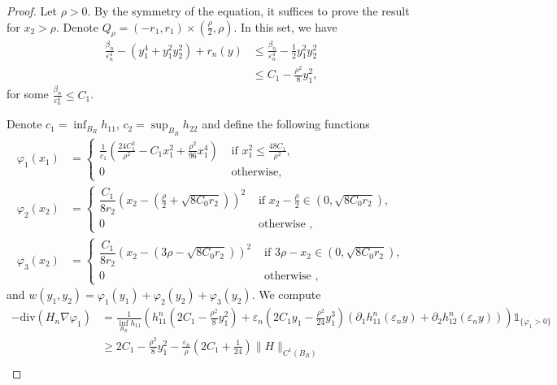 \documentclass[10pt,a4paper]{article}
\newcommand{\divg}{\mathrm{div}}
\numberwithin{equation}{section}
\begin{document}
\begin{proof}
	Let $ \rho > 0 $. By the symmetry of the equation, it suffices to prove the result for $ x_2 > \rho $. Denote $ Q_{\rho} = (-r_1, r_1) \times \left( \frac{\rho}{2}, \rho \right) $. In this set, we have
	\begin{align*}
		\frac{\beta_n}{\varepsilon_n^{4}} - (y_1^4 + y_1^2y_2^2) + r_n(y) & \leq \frac{\beta_n}{\varepsilon_n^{4}} - \frac{1}{2} y_1^2 y_2^2 \\ 
										  &\leq C_1 - \frac{\rho^2}{8} y_1^2 ,
	\end{align*}
for some $ \frac{\beta_n}{\varepsilon_n^4} \leq C_1 $. 

Denote $ c_1 = \inf_{B_R} h_{11} $, $ c_2 = \sup_{B_R}h_{22} $ and define the following functions
\begin{align*}
	\varphi_1(x_1) & = \begin{cases}
		\frac{1}{c_1} \left( \frac{24C_1^2}{\rho^2} - C_1 x_1^2 + \frac{\rho^2}{96} x_1^4 \right)  & \text{ if } x_1^2 \leq \frac{48C_1}{\rho^2}, \\
		0 & \text{ otherwise},
	\end{cases} \\ 
		\varphi_2(x_2) & = \begin{cases}
			\dfrac{C_1}{8r_2} \left( x_2 - \left( \frac{\rho}{2} +\sqrt{8C_0r_2} \right)  \right)^2 & \text{ if } x_2 - \frac{\rho}{2} \in  \left( 0, \sqrt{8C_0r_2} \right), \\ 
			0  & \text{ otherwise },
		\end{cases} \\ 
		\varphi_3(x_2) & = \begin{cases}
			\dfrac{C_1}{8r_2} \left( x_2 - \left( 3\rho -  \sqrt{8C_0r_2} \right)  \right)^2 & \text{ if } 3\rho - x_2 \in  \left( 0,\sqrt{8C_0r_2} \right), \\ 
			0  & \text{ otherwise },
		\end{cases}
\end{align*}
and $ w (y_1, y_2) = \varphi_1(y_1) + \varphi_2(y_2) + \varphi_3(y_2) $. We compute
\begin{align*}
	-\divg(H_n \nabla \varphi_1) &= \frac{1}{\inf_{B_R}h_{11}} \left( h_{11}^n \left( 2C_1 - \frac{\rho^2}{8} y_1^2 \right) +\varepsilon_n \left( 2C_1 y_1 - \frac{\rho^2}{24} y_1^3 \right)(\partial_1 h^n_{11}(\varepsilon_n y) + \partial_2 h^n_{12}(\varepsilon_n y)) \right)\mathbb{1}_{\{ \varphi_1 > 0\}} \\
				     &\geq 2C_1 - \frac{\rho^2}{8}y_1^2 - \frac{\varepsilon_n}{\rho}\left(2C_1 + \frac{1}{24}\right)\|H\|_{C^1(B_R)}\\

\end{align*}
\end{proof}
\end{document}
